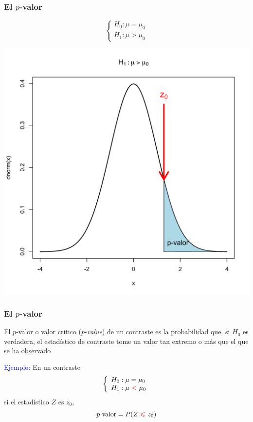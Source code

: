 \documentclass[12pt,t]{beamer}\usepackage[]{graphicx}\usepackage[]{color}
\newcommand{\red}[1]{\textcolor{red}{#1}}
\newcommand{\blue}[1]{\textcolor{blue}{#1}}
\renewcommand{\emph}[1]{{\color{red}#1}}
\renewcommand{\leq}{\leqslant}
\theoremstyle{plain}
\theoremstyle{definition}
\begin{document}
\begin{frame}
\frametitle{El $p$-valor}
\vspace*{-0.75cm}

$$
\left\{\begin{array}{l}
H_{0}:\mu=\mu_{0}\\ H_{1}:\mu>\mu_{0}
\end{array}
\right.
$$
\begin{center}
\includegraphics[width=0.7\linewidth]{pvalor01.pdf}
\end{center}

\end{frame}



\begin{frame}
\frametitle{El $p$-valor}

El  \emph{$p$-valor} o  \emph{valor crítico}  ($p$-\textsl{value}) de un contraste es la probabilidad que, si $H_0$ es verdadera, el estadístico de contraste tome un valor tan extremo o  más que el que se ha observado
\medskip

\blue{Ejemplo:} En un contraste
$$
\left\{\begin{array}{l}
H_{0}:\mu=\mu_{0}\\ H_{1}:\mu\ \red{<}\ \mu_{0}
\end{array}
\right.
$$
si el estadístico $Z$  es  $z_0$,
$$
\mbox{$p$-valor}=P(Z\ \red{\leq}\ z_0)
$$
\end{frame}
\end{document}
